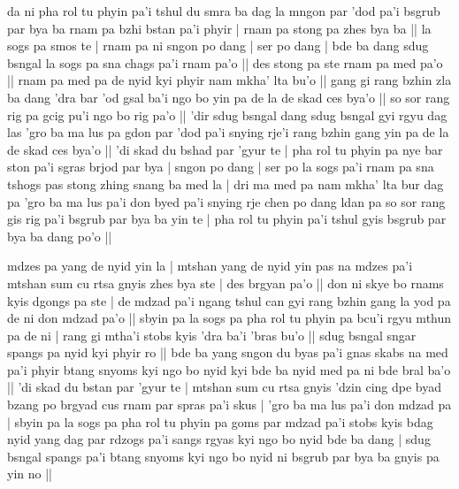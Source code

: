 \documentclass[11pt,twoside]{article}\makeatletter
\begin{document}
\label{TV5.1}da ni pha rol tu phyin pa'i tshul du smra ba dag la mngon par 'dod pa'i bsgrub par bya ba rnam pa bzhi bstan pa'i phyir | rnam pa stong pa zhes bya ba  || la sogs pa smos te | rnam pa ni sngon po dang | ser po dang | bde ba dang sdug bsngal la sogs pa sna chags pa'i rnam pa'o || des stong pa ste rnam pa med pa'o || rnam pa med pa de nyid kyi phyir nam mkha' lta bu'o || gang gi rang bzhin zla ba dang 'dra bar 'od gsal ba'i ngo bo yin pa de la de skad ces bya'o || so sor rang rig pa gcig pu'i ngo bo rig pa'o || 'dir sdug bsngal dang sdug bsngal gyi rgyu dag las 'gro ba ma lus pa gdon par 'dod pa'i snying rje'i rang bzhin gang yin pa de la de skad ces bya'o || 'di skad du bshad par 'gyur te | pha rol tu phyin pa nye bar ston pa'i sgras brjod par bya | sngon po dang | ser po la sogs pa'i rnam pa sna tshogs pas stong zhing snang ba med la | dri ma med pa nam mkha' lta bur dag pa 'gro ba ma lus pa'i don byed pa'i snying rje chen po dang ldan pa so sor rang gis rig pa'i bsgrub par bya ba yin te | pha rol tu phyin pa'i tshul gyis bsgrub par bya ba dang po'o ||\par
\label{TV5.2}mdzes pa yang de nyid yin la | mtshan yang de nyid yin pas na mdzes pa'i mtshan sum cu rtsa gnyis zhes bya ste | des brgyan pa'o || don ni skye bo rnams kyis dgongs pa ste | de mdzad pa'i ngang tshul can gyi rang bzhin gang la yod pa de ni don mdzad pa'o || sbyin pa la sogs pa pha rol tu phyin pa bcu'i rgyu mthun pa de ni | rang gi mtha'i stobs kyis 'dra ba'i 'bras bu'o || sdug bsngal sngar spangs pa nyid kyi phyir ro || bde ba yang sngon du byas pa'i gnas skabs na med pa'i phyir btang snyoms kyi ngo bo nyid kyi bde ba nyid med pa ni bde bral ba'o || 'di skad du bstan par 'gyur te | mtshan sum cu rtsa gnyis 'dzin cing dpe byad bzang po brgyad cus rnam par spras pa'i skus | 'gro ba ma lus pa'i don mdzad pa | sbyin pa la sogs pa pha rol tu phyin pa goms par mdzad pa'i stobs kyis bdag nyid yang dag par rdzogs pa'i sangs rgyas kyi ngo bo nyid bde ba dang | sdug bsngal spangs pa'i btang snyoms kyi ngo bo nyid ni bsgrub par bya ba gnyis pa yin no || 
\par
\end{document}
